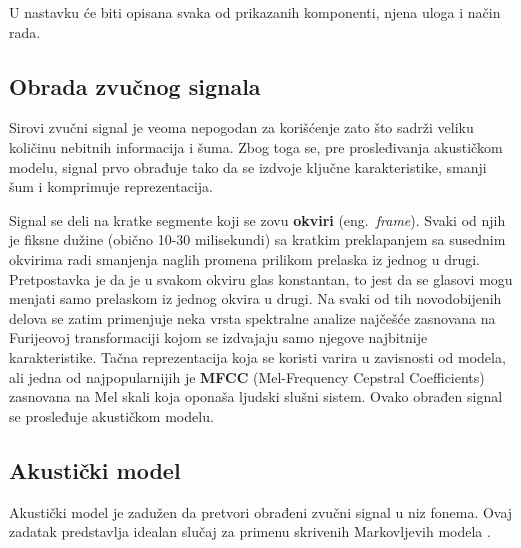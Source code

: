 \documentclass[a4paper]{article}
\begin{document}
U nastavku će biti opisana svaka od prikazanih komponenti, njena uloga i način rada.

\subsection{Obrada zvučnog signala}
\label{sec:obrada}
Sirovi zvučni signal je veoma nepogodan za korišćenje zato što sadrži veliku količinu nebitnih informacija i šuma.
Zbog toga se, pre prosleđivanja akustičkom modelu, signal prvo obrađuje tako da se izdvoje ključne karakteristike, smanji šum i komprimuje reprezentacija.

Signal se deli na kratke segmente koji se zovu \textbf{okviri} (eng.~{\em frame}).
Svaki od njih je fiksne dužine (obično 10-30 milisekundi) sa kratkim preklapanjem sa susednim okvirima radi smanjenja naglih promena prilikom prelaska iz jednog u drugi.
Pretpostavka je da je u svakom okviru glas konstantan, to jest da se glasovi mogu menjati samo prelaskom iz jednog okvira u drugi.
Na svaki od tih novodobijenih delova se zatim primenjuje neka vrsta spektralne analize najčešće zasnovana na Furijeovoj transformaciji kojom se izdvajaju samo njegove najbitnije karakteristike.
Tačna reprezentacija koja se koristi varira u zavisnosti od modela, ali jedna od najpopularnijih je \textbf{MFCC} (Mel-Frequency Cepstral Coefficients) \cite{dave2013feature} zasnovana na Mel skali koja oponaša ljudski slušni sistem.
Ovako obrađen signal se prosleđuje akustičkom modelu.

\subsection{Akustički model}
Akustički model je zadužen da pretvori obrađeni zvučni signal u niz fonema. 
Ovaj zadatak predstavlja idealan slučaj za primenu skrivenih Markovljevih modela \cite{rabiner1989hmm}.
\end{document}

